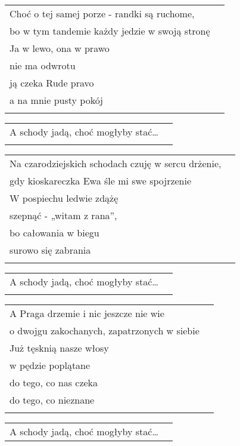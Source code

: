 \documentclass[a5paper]{article}
\begin{document}
\noindent
\begin{tabular}{@{}p{8.5cm}p{3cm}@{}}
Choć o tej samej porze - randki są ruchome, \\
bo w tym tandemie każdy jedzie w swoją stronę \\
Ja w lewo, ona w prawo\\
nie ma odwrotu \\
ją czeka Rude pravo\\
a na mnie pusty pokój\\\\
\end{tabular}
 
\noindent
\begin{tabular}{@{}p{8.5cm}p{3cm}@{}}
A schody jadą, choć mogłyby stać… \\ \\
\end{tabular}
 
\noindent
\begin{tabular}{@{}p{8.5cm}p{3cm}@{}}
Na czarodziejskich schodach czuję w sercu drżenie, \\
gdy  kioskareczka Ewa śle mi swe spojrzenie\\
W pospiechu ledwie zdążę\\
szepnąć  - „witam z rana”,\\
bo całowania w biegu\\
surowo się zabrania\\\\
\end{tabular}
 
\noindent
\begin{tabular}{@{}p{8.5cm}p{3cm}@{}}
A schody jadą, choć mogłyby stać…\\\\
\end{tabular}
 
\noindent
\begin{tabular}{@{}p{8.5cm}p{3cm}@{}}
A Praga drzemie i nic jeszcze nie wie\\
o dwojgu zakochanych, zapatrzonych w siebie\\
Już tęsknią nasze włosy\\
w pędzie poplątane\\
do tego, co nas czeka\\
do tego, co nieznane\\\\
\end{tabular}
 
\noindent
\begin{tabular}{@{}p{8.5cm}p{3cm}@{}}
A schody jadą, choć mogłyby stać…
\end{tabular}
\end{document}
